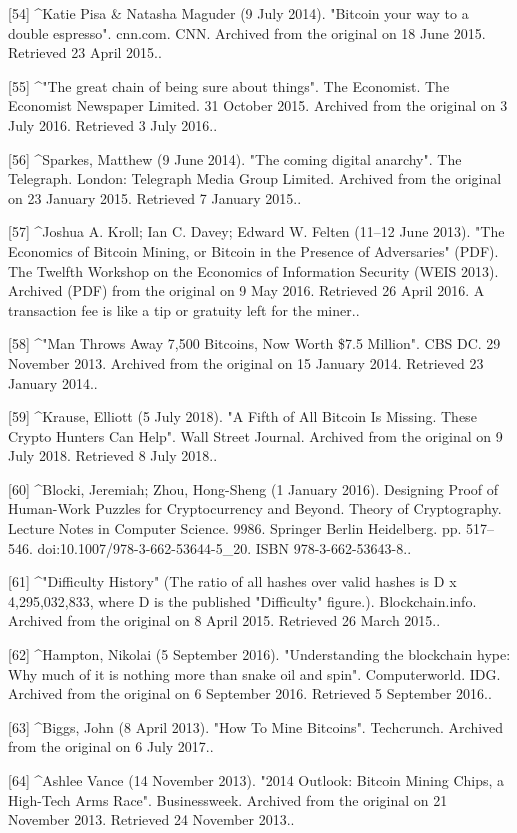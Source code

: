 [54]
^Katie Pisa & Natasha Maguder (9 July 2014). "Bitcoin your way to a double espresso". cnn.com. CNN. Archived from the original on 18 June 2015. Retrieved 23 April 2015..

[55]
^"The great chain of being sure about things". The Economist. The Economist Newspaper Limited. 31 October 2015. Archived from the original on 3 July 2016. Retrieved 3 July 2016..

[56]
^Sparkes, Matthew (9 June 2014). "The coming digital anarchy". The Telegraph. London: Telegraph Media Group Limited. Archived from the original on 23 January 2015. Retrieved 7 January 2015..


[57]
^Joshua A. Kroll; Ian C. Davey; Edward W. Felten (11–12 June 2013). "The Economics of Bitcoin Mining, or Bitcoin in the Presence of Adversaries" (PDF). The Twelfth Workshop on the Economics of Information Security (WEIS 2013). Archived (PDF) from the original on 9 May 2016. Retrieved 26 April 2016. A transaction fee is like a tip or gratuity left for the miner..

[58]
^"Man Throws Away 7,500 Bitcoins, Now Worth \$7.5 Million". CBS DC. 29 November 2013. Archived from the original on 15 January 2014. Retrieved 23 January 2014..

[59]
^Krause, Elliott (5 July 2018). "A Fifth of All Bitcoin Is Missing. These Crypto Hunters Can Help". Wall Street Journal. Archived from the original on 9 July 2018. Retrieved 8 July 2018..

[60]
^Blocki, Jeremiah; Zhou, Hong-Sheng (1 January 2016). Designing Proof of Human-Work Puzzles for Cryptocurrency and Beyond. Theory of Cryptography. Lecture Notes in Computer Science. 9986. Springer Berlin Heidelberg. pp. 517–546. doi:10.1007/978-3-662-53644-5_20. ISBN 978-3-662-53643-8..

[61]
^"Difficulty History" (The ratio of all hashes over valid hashes is D x 4,295,032,833, where D is the published "Difficulty" figure.). Blockchain.info. Archived from the original on 8 April 2015. Retrieved 26 March 2015..

[62]
^Hampton, Nikolai (5 September 2016). "Understanding the blockchain hype: Why much of it is nothing more than snake oil and spin". Computerworld. IDG. Archived from the original on 6 September 2016. Retrieved 5 September 2016..

[63]
^Biggs, John (8 April 2013). "How To Mine Bitcoins". Techcrunch. Archived from the original on 6 July 2017..

[64]
^Ashlee Vance (14 November 2013). "2014 Outlook: Bitcoin Mining Chips, a High-Tech Arms Race". Businessweek. Archived from the original on 21 November 2013. Retrieved 24 November 2013..

